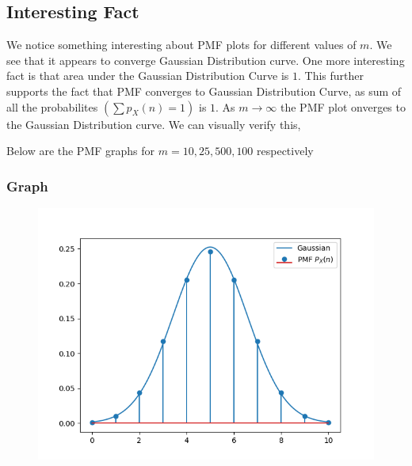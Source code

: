 \documentclass{beamer}
\providecommand{\brak}[1]{\ensuremath{\left(#1\right)}}
\theoremstyle{remark}
\numberwithin{equation}{section}
\begin{document}
      \subsection{Interesting Fact}
      \begin{frame}
        We notice something interesting about PMF plots for different values of $m$. We see that it appears to converge Gaussian Distribution curve. One more interesting fact is that area under the Gaussian Distribution Curve is $1$. This further supports the fact that PMF converges to Gaussian Distribution Curve, as sum of all the probabilites $\brak{\sum p_X\brak{n} = 1}$ is $1$.  As $m \rightarrow \infty$ the PMF plot onverges to the Gaussian Distribution curve. We can visually verify this, \newline

        Below are the PMF graphs for $m = 10, 25, 500, 100$ respectively      
      \end{frame}
      \begin{frame}[fragile]
        \frametitle{Graph}
        \begin{figure}[h!]
          \centering
          \includegraphics[width=1\columnwidth]{figs/pmf2.png}
          \label{stemplot}
        \end{figure}
      \end{frame}
\end{document}
